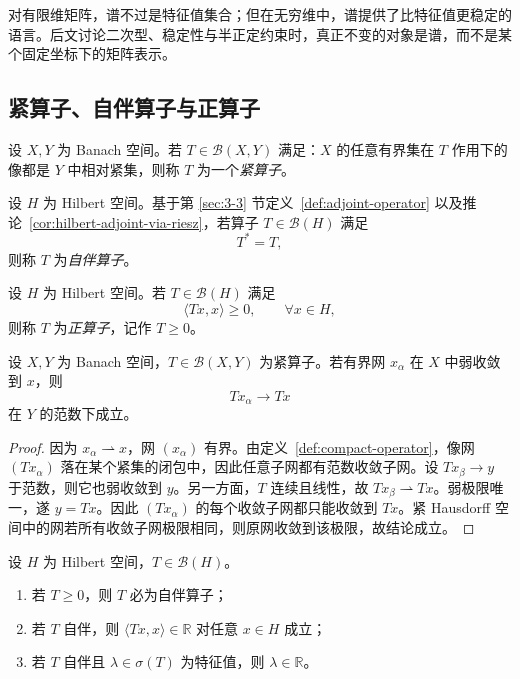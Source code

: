 \begin{remark}
对有限维矩阵，谱不过是特征值集合；但在无穷维中，谱提供了比特征值更稳定的语言。后文讨论二次型、稳定性与半正定约束时，真正不变的对象是谱，而不是某个固定坐标下的矩阵表示。
\end{remark}

\subsection{紧算子、自伴算子与正算子}

\begin{definition}[紧算子]\label{def:compact-operator}
设 $X,Y$ 为 Banach 空间。若 $T\in \mathcal B(X,Y)$ 满足：$X$ 的任意有界集在 $T$ 作用下的像都是 $Y$ 中相对紧集，则称 $T$ 为一个\emph{紧算子}。
\end{definition}

\begin{definition}[自伴算子]\label{def:self-adjoint-operator}
设 $H$ 为 Hilbert 空间。基于第 \ref{sec:3-3} 节定义~\ref{def:adjoint-operator} 以及推论~\ref{cor:hilbert-adjoint-via-riesz}，若算子 $T\in \mathcal B(H)$ 满足
\[
T^\ast=T,
\]
则称 $T$ 为\emph{自伴算子}。
\end{definition}

\begin{definition}[正算子]\label{def:positive-operator}
设 $H$ 为 Hilbert 空间。若 $T\in \mathcal B(H)$ 满足
\[
\langle Tx,x\rangle\ge 0,\qquad \forall x\in H,
\]
则称 $T$ 为\emph{正算子}，记作 $T\ge 0$。
\end{definition}

\begin{proposition}[紧算子把弱收敛提升为强收敛]
设 $X,Y$ 为 Banach 空间，$T\in \mathcal B(X,Y)$ 为紧算子。若有界网 $x_\alpha$ 在 $X$ 中弱收敛到 $x$，则
\[
Tx_\alpha\to Tx
\]
在 $Y$ 的范数下成立。
\end{proposition}

\begin{proof}
因为 $x_\alpha\rightharpoonup x$，网 $(x_\alpha)$ 有界。由定义~\ref{def:compact-operator}，像网 $(Tx_\alpha)$ 落在某个紧集的闭包中，因此任意子网都有范数收敛子网。设 $Tx_\beta\to y$ 于范数，则它也弱收敛到 $y$。另一方面，$T$ 连续且线性，故 $Tx_\beta\rightharpoonup Tx$。弱极限唯一，遂 $y=Tx$。因此 $(Tx_\alpha)$ 的每个收敛子网都只能收敛到 $Tx$。紧 Hausdorff 空间中的网若所有收敛子网极限相同，则原网收敛到该极限，故结论成立。
\end{proof}

\begin{proposition}[正算子的基本性质]
设 $H$ 为 Hilbert 空间，$T\in \mathcal B(H)$。
\begin{enumerate}
  \item 若 $T\ge 0$，则 $T$ 必为自伴算子；
  \item 若 $T$ 自伴，则 $\langle Tx,x\rangle\in \mathbb R$ 对任意 $x\in H$ 成立；
  \item 若 $T$ 自伴且 $\lambda\in \sigma(T)$ 为特征值，则 $\lambda\in \mathbb R$。
\end{enumerate}
\end{proposition}

